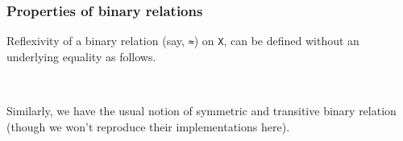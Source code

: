 \documentclass[sigplan,screen]{acmart}
\begin{document}

\subsubsection{Properties of binary relations}\label{properties-of-binary-relations}
Reflexivity of a binary relation (say, \texttt{≈}) on \texttt{X}, can be defined without an underlying equality as follows.
\begin{code}
\>[0]\AgdaSpace{}%
\AgdaSymbol{:}\AgdaSpace{}%
\AgdaSymbol{\{}\AgdaSpace{}%
\AgdaSymbol{:}\AgdaSpace{}%
\AgdaSpace{}%
\AgdaSpace{}%
\AgdaSymbol{\}}\AgdaSpace{}%
\AgdaSpace{}%
\AgdaSpace{}%
\AgdaSpace{}%
\AgdaSpace{}%
\AgdaSpace{}%
\AgdaSpace{}%
\AgdaSpace{}%
\AgdaSpace{}%
\<%
\\
\>[0]\AgdaSpace{}%
\AgdaSpace{}%
\AgdaSymbol{=}\AgdaSpace{}%
\AgdaSpace{}%
\AgdaSpace{}%
\AgdaSpace{}%
\AgdaSpace{}%
\AgdaSpace{}%
\<%
\end{code}
Similarly, we have the usual notion of symmetric and transitive binary relation (though we won't reproduce their implementations here).
\end{document}
